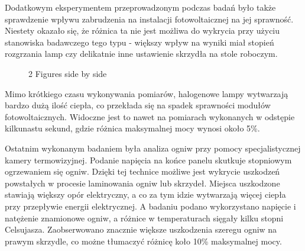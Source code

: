 \documentclass[12pt, a4paper]{article}
\begin{document}
Dodatkowym eksperymentem przeprowadzonym podczas badań było także sprawdzenie wpływu zabrudzenia na instalacji fotowoltaicznej na jej sprawność. Niestety okazało się, że różnica ta nie jest możliwa do wykrycia przy użyciu stanowiska badawczego tego typu - większy wpływ na wyniki miał stopień rozgrzania lamp czy delikatnie inne ustawienie skrzydła na stole roboczym.

\begin{figure}%
    \centering
    \qquad
    \caption{2 Figures side by side}%
    \label{fig:example}%
\end{figure}

Mimo krótkiego czasu wykonywania pomiarów, halogenowe lampy wytwarzają bardzo dużą ilość ciepła, co przekłada się na spadek sprawności modułów fotowoltaicznych. Widoczne jest to nawet na pomiarach wykonanych w odstępie kilkunastu sekund, gdzie różnica maksymalnej mocy wynosi około 5\%. 

Ostatnim wykonanym badaniem była analiza ogniw przy pomocy specjalistycznej kamery termowizyjnej. Podanie napięcia na końce panelu skutkuje stopniowym ogrzewaniem się ogniw. Dzięki tej technice możliwe jest wykrycie uszkodzeń powstałych w procesie laminowania ogniw lub skrzydeł. Miejsca uszkodzone stawiają większy opór elektryczny, a co za tym idzie wytwarzają więcej ciepła przy przepływie energii elektrycznej. A badaniu podano wykorzystano napięcie i natężenie znamionowe ogniw, a różnice w temperaturach sięgały kilku stopni Celsujasza. Zaobserwowano znacznie większe uszkodzenia szeregu ogniw na prawym skrzydle, co możne tłumaczyć różnicę koło 10\% maksymalnej mocy.
\end{document}

